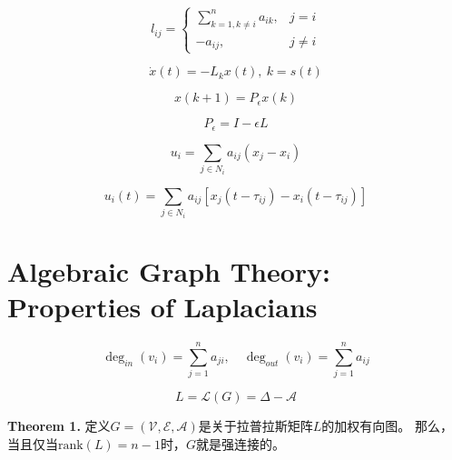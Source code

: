 \documentclass{article}
\begin{document}
\begin{equation}
    l_{ij} = \left\{
        \begin{array}{ll}
            \sum_{k=1,k\ne i}^n a_{ik}, & j=i\\
            -a_{ij}, & j\ne i
        \end{array}\right.
        \tag{7}
        \label{7}
\end{equation}

\begin{equation}
    \dot{x}(t) = -L_kx(t),\ k=s(t) 
    \tag{8}
    \label{8}
\end{equation}

\begin{equation}
    x(k+1) = P_\epsilon x(k)
    \tag{9}
    \label{9}
\end{equation}

\begin{equation}
    P_\epsilon = I - \epsilon L
    \tag{10}
    \label{10}
\end{equation}

\begin{equation}
    u_i = \sum_{j\in N_i}a_{ij}(x_j-x_i)
    \tag{A1}
    \label{A1}
\end{equation}

\begin{equation}
    u_i(t) = \sum_{j\in N_i}a_{ij}[x_j(t-\tau_{ij})-x_i(t-\tau_{ij})]
    \tag{A2}
    \label{A2}
\end{equation}

\section{Algebraic Graph Theory: Properties of Laplacians}

\begin{equation}
    \deg_{in}(v_i) = \sum_{j=1}^{n}a_{ji},\quad \deg_{out}(v_i) = \sum_{j=1}^{n}a_{ij}
    \tag{11}
    \label{11}
\end{equation}

\begin{equation}
    L = \mathcal{L}(G) = \Delta-\mathcal{A}
    \tag{12}
    \label{12}
\end{equation}

\noindent \textbf{Theorem 1.} 定义$G=(\mathcal{V},\mathcal{E},\mathcal{A})$是关于拉普拉斯矩阵$L$的加权有向图。
那么，当且仅当$\text{rank}(L)=n-1$时，$G$就是强连接的。
\end{document}
